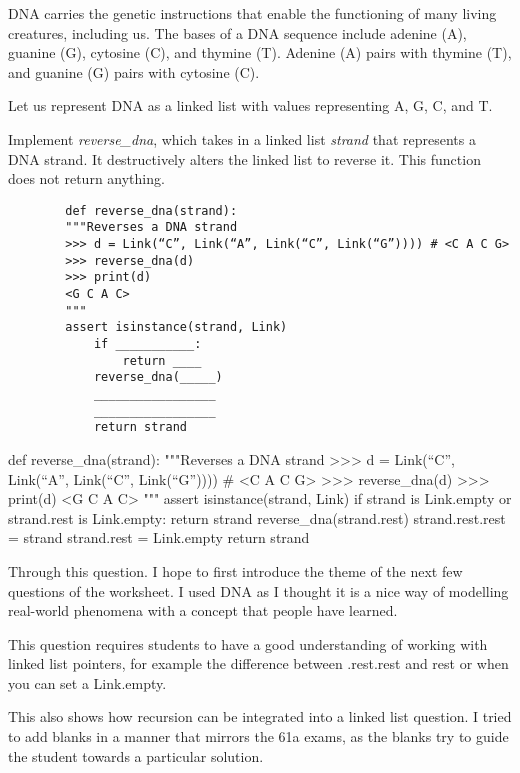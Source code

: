 
\begin{blocksection}
    \question DNA carries the genetic instructions that enable the functioning of many living creatures, including us. The bases of a DNA sequence include adenine (A), guanine (G), cytosine (C), and thymine (T). Adenine (A) pairs with thymine (T), and guanine (G) pairs with cytosine (C).

    Let us represent DNA as a linked list with values representing A, G, C, and T.
        
    Implement \textit{reverse\_dna}, which takes in a linked list \textit{strand} that represents a DNA strand. It destructively alters the linked list to reverse it. This function does not return anything.
    
    \begin{lstlisting}
        def reverse_dna(strand):
        """Reverses a DNA strand 
        >>> d = Link(“C”, Link(“A”, Link(“C”, Link(“G”)))) # <C A C G>
        >>> reverse_dna(d)
        >>> print(d)
        <G C A C>
        """
        assert isinstance(strand, Link)
            if ___________:
                return ____
            reverse_dna(_____)
            _________________
            _________________
            return strand        
    \end{lstlisting}
    
    \begin{solution}
        def reverse_dna(strand):
        """Reverses a DNA strand 
        >>> d = Link(“C”, Link(“A”, Link(“C”, Link(“G”)))) # <C A C G>
        >>> reverse_dna(d)
        >>> print(d)
        <G C A C>
        """
        assert isinstance(strand, Link)
            if strand is Link.empty or strand.rest is Link.empty:
                return strand
            reverse_dna(strand.rest)
            strand.rest.rest = strand
            strand.rest = Link.empty
            return strand
    \end{solution}
    \end{blocksection}
    
    \begin{questionmeta}
        Through this question. I hope to first introduce the theme of the next few questions of the worksheet. I used DNA as I thought it is a nice way of modelling real-world phenomena with a concept that people have learned. 

        This question requires students to have a good understanding of working with linked list pointers, for example the difference between .rest.rest and rest or when you can set a Link.empty. 

        This also shows how recursion can be integrated into a linked list question. I tried to add blanks in a manner that mirrors the 61a exams, as the blanks try to guide the student towards a particular solution. 
    \end{questionmeta}
    